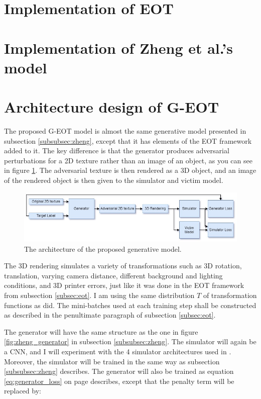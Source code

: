 \section{Implementation of EOT}

\section{Implementation of Zheng et al.'s model}

\section{Architecture design of G-EOT}
    \label{sec:architecture_design}
    
The proposed G-EOT model is almost the same generative model presented in subsection \ref{subsubsec:zheng}, except that it has elements of the EOT framework \cite{athalye} added to it. The key difference is that the generator produces adversarial perturbations for a 2D texture rather than an image of an object, as you can see in figure \ref{fig:proposed_model}. The adversarial texture is then rendered as a 3D object, and an image of the rendered object is then given to the simulator and victim model.

\begin{figure}[h]
    \centering
    \includegraphics[width=1\textwidth]{graphics/model.jpg}
    \caption{The architecture of the proposed generative model.}
    \label{fig:proposed_model}
\end{figure}

The 3D rendering simulates a variety of transformations such as 3D rotation, translation, varying camera distance, different background and lighting conditions, and 3D printer errors, just like it was done in the EOT framework from subsection \ref{subsec:eot}. I am using the same distribution $T$ of transformation functions as \cite{athalye} did. The mini-batches used at each training step shall be constructed as described in the penultimate paragraph of subsection \ref{subsec:eot}.

The generator will have the same structure as the one in figure \ref{fig:zheng_generator} in subsection \ref{subsubsec:zheng}. The simulator will again be a CNN, and I will experiment with the 4 simulator architectures used in \cite{zheng_black_box_GAN}. Moreover, the simulator will be trained in the same way as subsection \ref{subsubsec:zheng} describes. The generator will also be trained as equation \ref{eq:generator_loss} on page \pageref{eq:generator_loss} describes, except that the penalty term will be replaced by:

